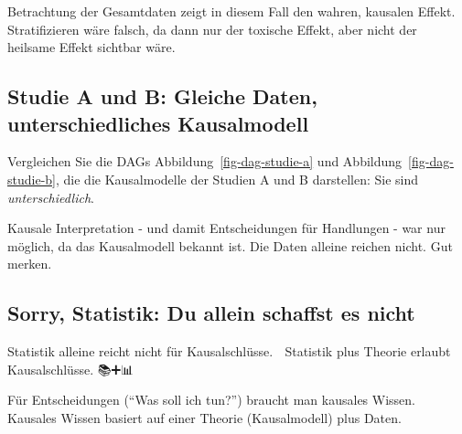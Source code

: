 \documentclass[
  a4paper,
  DIV=11]{scrreprt}
\theoremstyle{definition}
\theoremstyle{remark}
\begin{document}
\begin{tcolorbox}[enhanced jigsaw, colframe=quarto-callout-important-color-frame, title=\textcolor{quarto-callout-important-color}{\faExclamation}\hspace{0.5em}{Wichtig}, breakable, leftrule=.75mm, coltitle=black, toptitle=1mm, bottomrule=.15mm, bottomtitle=1mm, opacityback=0, arc=.35mm, rightrule=.15mm, left=2mm, colbacktitle=quarto-callout-important-color!10!white, opacitybacktitle=0.6, toprule=.15mm, titlerule=0mm, colback=white]
Betrachtung der Gesamtdaten zeigt in diesem Fall den wahren, kausalen
Effekt. Stratifizieren wäre falsch, da dann nur der toxische Effekt,
aber nicht der heilsame Effekt sichtbar wäre.
\end{tcolorbox}

\hypertarget{studie-a-und-b-gleiche-daten-unterschiedliches-kausalmodell}{%
\subsection{Studie A und B: Gleiche Daten, unterschiedliches
Kausalmodell}\label{studie-a-und-b-gleiche-daten-unterschiedliches-kausalmodell}}

Vergleichen Sie die DAGs Abbildung~\ref{fig-dag-studie-a} und
Abbildung~\ref{fig-dag-studie-b}, die die Kausalmodelle der Studien A
und B darstellen: Sie sind \emph{unterschiedlich}.

Kausale Interpretation - und damit Entscheidungen für Handlungen - war
nur möglich, da das Kausalmodell bekannt ist. Die Daten alleine reichen
nicht. Gut merken.

\hypertarget{sorry-statistik-du-allein-schaffst-es-nicht}{%
\subsection{Sorry, Statistik: Du allein schaffst es
nicht}\label{sorry-statistik-du-allein-schaffst-es-nicht}}

Statistik alleine reicht nicht für Kausalschlüsse. 🧟 Statistik plus
Theorie erlaubt Kausalschlüsse. 📚➕📊 🟰 🤩

\begin{tcolorbox}[enhanced jigsaw, colframe=quarto-callout-important-color-frame, title=\textcolor{quarto-callout-important-color}{\faExclamation}\hspace{0.5em}{Wichtig}, breakable, leftrule=.75mm, coltitle=black, toptitle=1mm, bottomrule=.15mm, bottomtitle=1mm, opacityback=0, arc=.35mm, rightrule=.15mm, left=2mm, colbacktitle=quarto-callout-important-color!10!white, opacitybacktitle=0.6, toprule=.15mm, titlerule=0mm, colback=white]
Für Entscheidungen (``Was soll ich tun?'') braucht man kausales Wissen.
Kausales Wissen basiert auf einer Theorie (Kausalmodell) plus Daten.
\end{tcolorbox}
\end{document}
